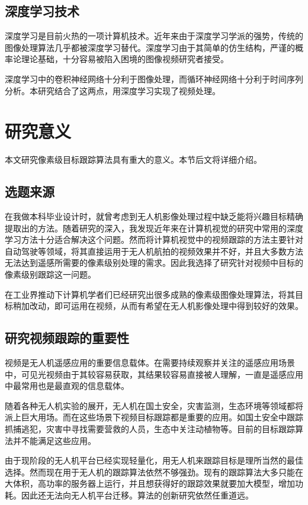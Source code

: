 \subsection{深度学习技术}
深度学习是目前火热的一项计算机技术。近年来由于深度学习学派的强势，传统的图像处理算法几乎都被深度学习替代。深度学习由于其简单的仿生结构，严谨的概率论理论基础，十分容易被陷入困境的图像视频研究者接受。
\par
深度学习中的卷积神经网络十分利于图像处理，而循环神经网络十分利于时间序列分析。本研究结合了这两点，用深度学习实现了视频处理。

\newpage
\section{研究意义}
本文研究像素级目标跟踪算法具有重大的意义。本节后文将详细介绍。
\subsection{选题来源}
在我做本科毕业设计\supercite{benchme}时，就曾考虑到无人机影像处理过程中缺乏能将兴趣目标精确提取出的方法。随着研究的深入，我发现近年来在计算机视觉的研究中常用的深度学习方法十分适合解决这个问题。然而将计算机视觉中的视频跟踪的方法主要针对自动驾驶等领域，将其直接运用于无人机航拍的视频效果并不好，并且大多数方法无法达到遥感所需要的像素级别处理的需求。因此我选择了研究针对视频中目标的像素级别跟踪这一问题。
\par
在工业界推动下计算机学者们已经研究出很多成熟的像素级图像处理算法，将其目标稍加改动，即可运用在视频，从而有希望在无人机影像处理中得到较好的效果。

\subsection{研究视频跟踪的重要性}
视频是无人机遥感应用的重要信息载体。在需要持续观察并关注的遥感应用场景中，可见光视频由于其较容易获取，其结果较容易直接被人理解，一直是遥感应用中最常用也是最直观的信息载体。
\par
随着各种无人机实验的展开，无人机在国土安全，灾害监测，生态环境等领域都将派上巨大用场。而在这些场景下视频目标跟踪都是重要的应用。如国土安全中跟踪抓捕逃犯，灾害中寻找需要营救的人员，生态中关注动植物等。目前的目标跟踪算法并不能满足这些应用。
\par
由于现阶段的无人机平台已经实现轻量化，用无人机来跟踪目标是理所当然的最佳选择。然而现在用于无人机的跟踪算法依然不够强劲。现有的跟踪算法大多只能在大体积，高功率的服务器上运行，并且想获得好的跟踪效果就要加大模型，增加功耗。因此还无法向无人机平台迁移。算法的创新研究依然任重道远。

